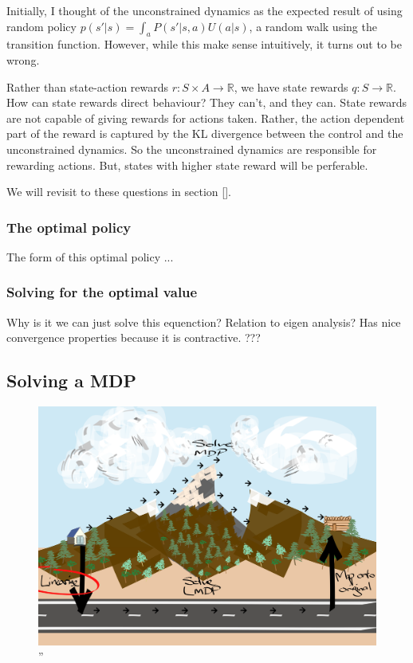Initially, I thought of the unconstrained dynamics as the expected result of using random policy
$p(s' | s) = \int_a P(s' | s, a)U(a|s)$, a random walk using the transition function.
However, while this make sense intuitively, it turns out to be wrong.

Rather than state-action rewards $r: S \times A \to \mathbb R$, we have state rewards $q: S \to \mathbb R$.
How can state rewards direct behaviour? They can't, and they can. State rewards are not capable of giving rewards for actions taken.
Rather, the action dependent part of the reward is captured by the KL divergence between the control and the unconstrained dynamics.
So the unconstrained dynamics are responsible for rewarding actions.
But, states with higher state reward will be perferable.

We will revisit to these questions in section [].

\subsubsection{\color{red}The optimal policy}

The form of this optimal policy ...

\subsubsection{\color{red}Solving for the optimal value}

Why is it we can just solve this equenction? Relation to eigen analysis?
Has nice convergence properties because it is contractive.
???

\subsection{Solving a MDP}

\begin{figure}
\centering
\includegraphics[width=1\textwidth,height=0.5\textheight]{../../pictures/drawings/abstract-representations-linear.png}
\caption{''}
\end{figure}

